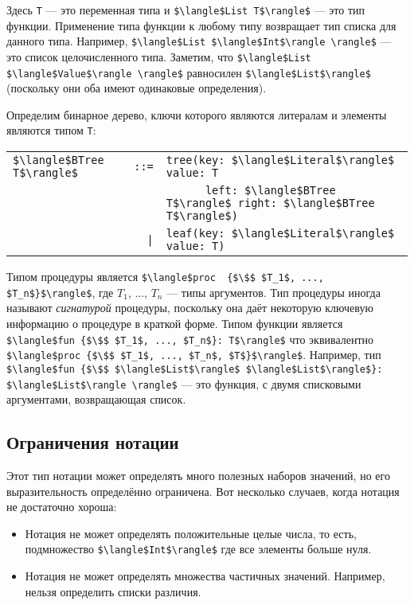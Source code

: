 Здесь \lstinline!T! --- это переменная типа и \lstinline!$\langle$List T$\rangle$! --- это тип функции. Применение типа функции к любому типу возвращает тип списка для данного типа. Например, \lstinline!$\langle$List $\langle$Int$\rangle \rangle$! --- это список целочисленного типа. Заметим, что \lstinline!$\langle$List $\langle$Value$\rangle \rangle$! равносилен \lstinline!$\langle$List$\rangle$! (поскольку они оба имеют одинаковые определения).

Определим бинарное дерево, ключи которого являются литералам и элементы являются типом \lstinline!T!:

\begin{tabular}{lrl}
  \lstinline!$\langle$BTree T$\rangle$! & \lstinline!::=! & \lstinline!tree(key: $\langle$Literal$\rangle$ value: T! \\
  & & \lstinline!      left: $\langle$BTree T$\rangle$ right: $\langle$BTree T$\rangle$)! \\
  & \lstinline!|! & \lstinline!leaf(key: $\langle$Literal$\rangle$ value: T)! 
\end{tabular}

Типом процедуры является \lstinline|$\langle$proc  {$\$$ $T_1$, ..., $T_n$}$\rangle$|, где $T_1$, ..., $T_n$ --- типы аргументов. Тип процедуры иногда называют \emph{сигнатурой} процедуры, поскольку она даёт некоторую ключевую информацию о процедуре в краткой форме. Типом функции является \lstinline|$\langle$fun {$\$$ $T_1$, ..., $T_n$}: T$\rangle$| что эквивалентно \lstinline|$\langle$proc {$\$$ $T_1$, ..., $T_n$, $T$}$\rangle$|. Например, тип \lstinline|$\langle$fun {$\$$ $\langle$List$\rangle$ $\langle$List$\rangle$}: $\langle$List$\rangle \rangle$| --- это функция, с двумя списковыми аргументами, возвращающая список.

\subsection*{Ограничения нотации}

Этот тип нотации может определять много полезных наборов значений, но его выразительность определённо ограничена. Вот несколько случаев, когда нотация не достаточно хороша:

\begin{itemize}
\item{Нотация не может определять положительные целые числа, то есть, подмножество \lstinline!$\langle$Int$\rangle$! где все элементы больше нуля.}

\item{Нотация не может определять множества частичных значений. Например, нельзя определить списки различия.}
\end{itemize}

